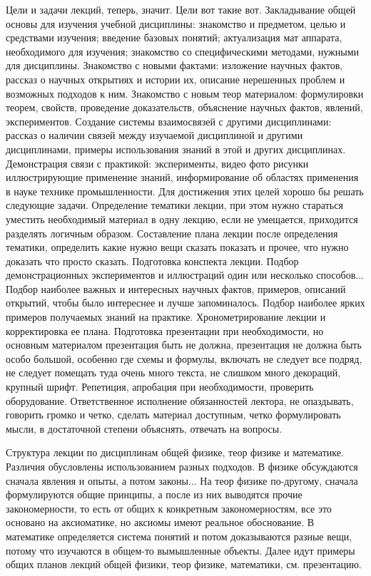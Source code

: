 \documentclass[a4paper, 12pt]{article}
\begin{document}
Цели и задачи лекций, теперь, значит. Цели вот такие вот. Закладывание 
общей основы для изучения учебной дисциплины: знакомство и предметом, 
целью и средствами изучения; введение базовых понятий; актуализация мат 
аппарата, необходимого для изучения; знакомство со специфическими 
методами, нужными для дисциплины. Знакомство с новыми фактами: изложение 
научных фактов, рассказ о научных открытиях и истории их, описание 
нерешенных проблем и возможных подходов к ним. Знакомство с новым теор 
материалом: формулировки теорем, свойств, проведение доказательств, 
объяснение научных фактов, явлений, экспериментов. Создание системы 
взаимосвязей с другими дисциплинами: рассказ о наличии связей между 
изучаемой дисциплиной и другими дисциплинами, примеры использования 
знаний в этой и других дисциплинах. Демонстрация связи с практикой: 
эксперименты, видео фото рисунки иллюстрирующие применение знаний, 
информирование об областях применения в науке технике промышленности. 
Для достижения этих целей хорошо бы решать следующие задачи. Определение 
тематики лекции, при этом нужно стараться уместить необходимый материал 
в одну лекцию, если не умещается, приходится разделять логичным образом. 
Составление плана лекции после определения тематики, определить какие 
нужно вещи сказать показать и прочее, что нужно доказать что просто 
сказать. Подготовка конспекта лекции. Подбор демонстрационных 
экспериментов и иллюстраций один или несколько способов... Подбор 
наиболее важных и интересных научных фактов, примеров, описаний 
открытий, чтобы было интереснее и лучше запоминалось. Подбор наиболее 
ярких примеров получаемых знаний на практике. Хронометрирование лекции 
и корректировка ее плана. Подготовка презентации при необходимости, но 
основным материалом презентация быть не должна, презентация не должна 
быть особо большой, особенно где схемы и формулы, включать не следует 
все подряд, не следует помещать туда очень много текста, не слишком 
много декораций, крупный шрифт. Репетиция, апробация при необходимости, 
проверить оборудование. Ответственное исполнение обязанностей лектора, 
не опаздывать, говорить громко и четко, сделать материал доступным, 
четко формулировать мысли, в достаточной степени объяснять, отвечать на 
вопросы.

Структура лекции по дисциплинам общей физике, теор физике и математике. 
Различия обусловлены использованием разных подходов. В физике 
обсуждаются сначала явления и опыты, а потом законы... На теор физике 
по-другому, сначала формулируются общие принципы, а после из них 
выводятся прочие закономерности, то есть от общих к конкретным 
закономерностям, все это основано на аксиоматике, но аксиомы имеют 
реальное обоснование. В математике определяется система понятий и потом 
доказываются разные вещи, потому что изучаются в общем-то вымышленные 
объекты. Далее идут примеры общих планов лекций общей физики, теор 
физике, математики, см. презентацию.
\end{document}
